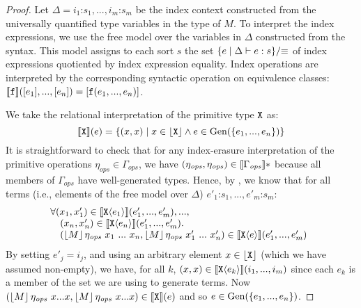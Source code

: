 \begin{proof}
  Let $\Delta = i_1\mathord:s_1,...,i_m\mathord:s_m$ be the index
  context constructed from the universally quantified type variables
  in the type of $M$.  To interpret the index expressions, we use the
  free model over the variables in $\Delta$ constructed from the
  syntax. This model assigns to each sort $s$ the set $\{ e \mathrel|
  \Delta \vdash e : s \}/\mathord\equiv$ of index expressions
  quotiented by index expression equality. Index operations are
  interpreted by the corresponding syntactic operation on equivalence
  classes: $\llbracket \texttt{\textup{f}} \rrbracket([e_1],...,[e_n]) =
  [\texttt{\textup{f}}(e_1,...,e_n)]$.

  We take the relational interpretation of the primitive type
  $\textup{\texttt{X}}$ as:
  \begin{displaymath}
    \llbracket \textup{\texttt{X}} \rrbracket(e) = \{ (x,x) \mathrel| x \in \left\lfloor \textup{\texttt{X}} \right\rfloor \land e \in \mathrm{Gen}(\{e_1,...,e_n\}) \}
  \end{displaymath}
  It is straightforward to check that for any index-erasure
  interpretation of the primitive operations $\eta_{\mathit{ops}} \in
  \Gamma_{\mathit{ops}}$, we have $(\eta_{\mathit{ops}},
  \eta_{\mathit{ops}}) \in \llbracket \Gamma_{\mathit{ops}} \rrbracket*$ because 
  all members of $\Gamma_{\mathit{ops}}$ have well-generated
  types. Hence, by , we know that for all
  terms (i.e., elements of the free model over $\Delta$)
  $e'_1\mathord:s_1,...,e'_m\mathord:s_m$:
  \begin{displaymath}%
    \begin{array}{@{}l}
      \forall (x_1,x_1') \in \rsem{\tyPrim{X}{e_1}}(e'_1,...,e'_m), ..., \\
      \quad(x_n, x'_n) \in \rsem{\tyPrim{X}{e_n}}(e'_1,...,e'_m). \\
      \quad (\tmSem{M} \eta_{\mathit{ops}}~x_1 ~...~x_n, \tmSem{M}\eta_{\mathit{ops}}~x'_1~...~x'_n) \in \rsem{\tyPrim{X}{e}}(e'_1,...,e'_m)
    \end{array}
  \end{displaymath}
  By setting $e'_j = i_j$, and using an arbitrary element $x \in
  \left\lfloor \textup{\texttt{X}} \right\rfloor$ (which we have assumed non-empty), we have,
  for all $k$, $(x,x) \in \llbracket \textup{\texttt{X}}\langle e_k \rangle \rrbracket(i_1,...,i_m)$ since
  each $e_k$ is a member of the set we are using to generate
  terms. Now $(\left\lfloor{M}\right\rfloor \eta_{\mathit{ops}}~x...x,
  \left\lfloor{M}\right\rfloor\eta_{\mathit{ops}}~x...x) \in \llbracket \textup{\texttt{X}} \rrbracket(e)$ and
  so $e \in \mathrm{Gen}(\{e_1,...,e_n\})$.
\end{proof}

